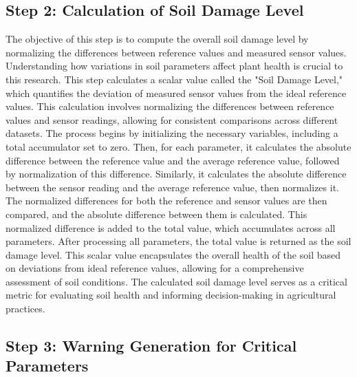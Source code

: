 \documentclass{book} %
\begin{document}
\noindent 

\noindent 
\subsection{}

\noindent 
\subsection{Step 2: Calculation of Soil Damage Level}

\noindent The objective of this step is to compute the overall soil damage level by normalizing the differences between reference values and measured sensor values. Understanding how variations in soil parameters affect plant health is crucial to this research. This step calculates a scalar value called the "Soil Damage Level," which quantifies the deviation of measured sensor values from the ideal reference values. This calculation involves normalizing the differences between reference values and sensor readings, allowing for consistent comparisons across different datasets. The process begins by initializing the necessary variables, including a total accumulator set to zero. Then, for each parameter, it calculates the absolute difference between the reference value and the average reference value, followed by normalization of this difference. Similarly, it calculates the absolute difference between the sensor reading and the average reference value, then normalizes it. The normalized differences for both the reference and sensor values are then compared, and the absolute difference between them is calculated. This normalized difference is added to the total value, which accumulates across all parameters. After processing all parameters, the total value is returned as the soil damage level. This scalar value encapsulates the overall health of the soil based on deviations from ideal reference values, allowing for a comprehensive assessment of soil conditions. The calculated soil damage level serves as a critical metric for evaluating soil health and informing decision-making in agricultural practices.

\noindent 

\noindent 
\subsection{Step 3: Warning Generation for Critical Parameters}
\end{document}
